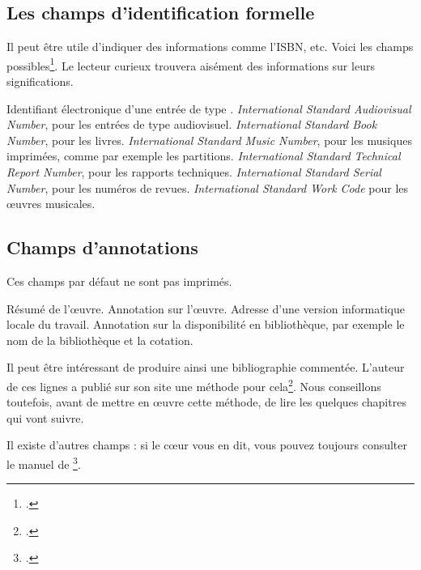 \subsection{Les champs d'identification formelle}

Il peut être utile d'indiquer des informations comme l'ISBN, etc. Voici les champs possibles\footcite[Par défaut,  imprime ces champs s'ils sont remplis. Il est toutefois possible de ne pas les afficher en passant l'option  au chargement du package][]{biblatex_isbn}.  Le lecteur curieux trouvera aisément des informations sur leurs significations.

\begin{fieldlist}
	 Identifiant électronique d'une entrée de type . 
   	 \emph{\textenglish{International Standard Audiovisual Number}}, pour les entrées de type audiovisuel.
   	 \emph{\textenglish{International Standard Book Number}}, pour les livres. 
   	 \emph{\textenglish{International Standard Music Number}}, pour les musiques imprimées, comme par exemple les partitions. 
   	 \emph{\textenglish{International Standard Technical Report Number}}, pour les rapports techniques. 
   	 \emph{\textenglish{International Standard Serial Number}}, pour les numéros de revues. 
   	 \emph{\textenglish{International Standard Work Code}} pour les œuvres musicales.
\end{fieldlist}

\subsection{Champs d'annotations}

Ces champs par défaut ne sont pas imprimés. 

\begin{fieldlist}
	 Résumé de l'œuvre. 
   	 Annotation sur l'œuvre.
   	 Adresse d'une version informatique locale du travail. 
   	 Annotation sur la disponibilité en bibliothèque, par exemple  le nom de la bibliothèque et la cotation.
	
\end{fieldlist}

\begin{plusloins}
Il peut être intéressant de produire ainsi une bibliographie commentée. L'auteur de ces lignes a publié sur son site une méthode pour cela\footcite{biblio_commentee}. Nous conseillons toutefois, avant de mettre en œuvre cette méthode, de lire les quelques chapitres qui vont suivre.
\end{plusloins}

Il existe d'autres champs : si le cœur vous en dit, vous pouvez toujours consulter le manuel de \footcite{biblatex_champs}.
